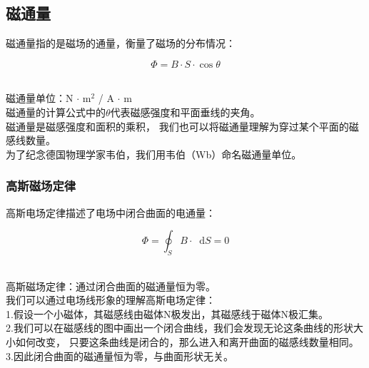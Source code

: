 \documentclass[UTF8]{ctexart}
\newcommand*{\dif}{\mathop{}\!\mathrm{d}}
\begin{document}
\subsection{磁通量}
    磁通量指的是磁场的通量，衡量了磁场的分布情况：
    \begin{large}
        \begin{equation*}
            \Phi=B\cdot S\cdot\cos{\theta}
        \end{equation*}
    \end{large}\\
    磁通量单位：N $\cdot$ m$^2$ / A $\cdot$ m\\[3mm]
    磁通量的计算公式中的$\theta$代表磁感强度和平面垂线的夹角。\\[3mm]
    磁通量是磁感强度和面积的乘积，
    我们也可以将磁通量理解为穿过某个平面的磁感线数量。\\[3mm]
    为了纪念德国物理学家韦伯，我们用韦伯（Wb）命名磁通量单位。\vspace{5pt}

\subsubsection{高斯磁场定律}
    高斯电场定律描述了电场中闭合曲面的电通量：\vspace{5pt}
    \begin{large}
        \begin{equation*}
            \Phi=\oint_SB \cdot \dif S=0
        \end{equation*}
    \end{large}\\
    高斯磁场定律：通过闭合曲面的磁通量恒为零。\\[8mm]
    我们可以通过电场线形象的理解高斯电场定律：\\[3mm]
    1.假设一个小磁体，其磁感线由磁体N极发出，其磁感线于磁体N极汇集。\\[3mm]
    2.我们可以在磁感线的图中画出一个闭合曲线，我们会发现无论这条曲线的形状大小如何改变，
    只要这条曲线是闭合的，那么进入和离开曲面的磁感线数量相同。\\[3mm]
    3.因此闭合曲面的磁通量恒为零，与曲面形状无关。

\newpage
\end{document}
